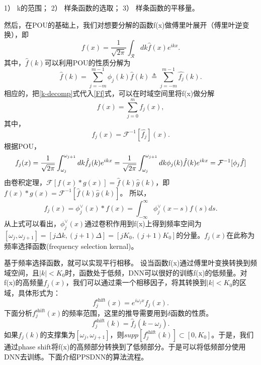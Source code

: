     1） k的范围；
    2） 样条函数的选取；
    3） 样条函数的平移量。


然后，在POU的基础上，我们对想要分解的函数f(x)做傅里叶展开（傅里叶逆变换），即
\begin{equation}
    f(x) = \frac{1}{\sqrt{2\pi}}\int_{\mathcal{R} }^{}dk\hat{f}(x)e^{ikx} . \label{Ff}
\end{equation}
其中，$\hat{f}(k)$可以利用POU的性质分解为
\begin{equation}
\widehat{f}(k)=%
{\displaystyle\sum\limits_{j=-m}^{m-1}}
\phi_{j}(k)\widehat{f}(k)\triangleq%
{\displaystyle\sum\limits_{j=-m}^{m-1}}
\widehat{f_{j}}(k). \label{k-decomp}%
\end{equation}
相应的，把\ref{k-decomp}式代入\ref{Ff}式，可以在时域空间里将f(x)做分解
\begin{equation}
f(x)=%
{\displaystyle\sum\limits_{j=0}^{m}}
f_{j}(x), \label{x-decomp}%
\end{equation}
其中，
\[
f_{j}(x)=\mathcal{F}^{-1}[\widehat{f_{j}}](x).
\]
根据POU，
\begin{equation*}
    f_{j}(x) = \frac{1}{\sqrt{2\pi}}\int_{\omega _j }^{\omega_{j+1}}dk\hat{f_j}(k)e^{ikx}=\\
    \frac{1}{\sqrt{2\pi}}\int_{\omega _j }^{\omega_{j+1}}dk\phi_j(k)\hat{f}(k)e^{ikx}=\mathcal{F}^{-1}[\phi_j \hat{f}]
\end{equation*}
由卷积定理，$\mathcal{F}[f(x)*g(x)] = \hat{f}(k)\hat{g}(k)$，即$f(x)*g(x) = \mathcal{F}^{-1}[\hat{f}(k)\hat{g}(k)]$。
所以，
\begin{equation}
    f_j(x) = \phi_j^{\vee}(x)*f(x)=\int_{-\infty }^{\infty} \phi _j^{\vee}(x-s)f(s)ds .
\end{equation}
从上式可以看出，$\phi_j^{\vee}(x)$通过卷积作用到f(x)上得到频率空间为$[\omega_j,\omega_{j+1}]=[j\Delta k,(j+1)\Delta]=[jK_0,(j+1)K_0]$的分量。$f_j(x)$在此称为频率选择函数(frequency selection kernal)。

基于频率选择函数，就可以实现平行相移。
设当函数f(x)通过傅里叶变换转换到频域空间，且$|k|<K_0$时，函数处于低频，DNN可以很好的训练f(x)的低频量。对f(x)的高频量$f_j(x)$，我们可以通过乘一个相移因子，将其转换到$|k|<K_0$的区域，具体形式为：
\begin{equation}
    f_j^{\text{shift}}(x) = e^{i\omega_jx}f_j(x) .
\end{equation}
下面分析$f_j^{\text{shift}}(x)$的频率范围，这里的推导需要用到$\delta$函数的性质。
\begin{equation}
    f_j^{\text{shift}}(k) = \hat{f}_j(k-\omega_j) .
\end{equation}
如果$f_j(k)$的支撑集为$[\omega_j,\omega_{j+1}]$，则$supp[f_j^{\text{shift}}(k)]\subset [0,K_0]$。于是，我们通过phase shift将f(x)的高频部分转换到了低频部分。于是可以将低频部分使用DNN去训练。下面介绍PPSDNN的算法流程。



